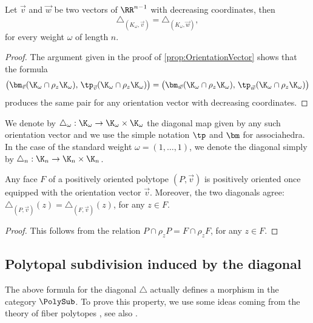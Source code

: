 \begin{proposition}\label{prop:IndepVect}
Let $\vec v$ and $\vec w$ be two vectors of $\RR^{n-1}$ with decreasing coordinates, then \[\triangle_{(K_\omega, \vec v)}=\triangle_{(K_\omega, \vec w)},\]
for every weight $\omega$ of length $n$.
\end{proposition}

\begin{proof}
The argument given in the proof of \cref{prop:OrientationVector} shows that the formula
\[\bigl(\bm_{\vec v}(\K_\omega\cap \rho_z \K_\omega),\, \tp_{\vec v}(\K_\omega\cap \rho_z \K_\omega)\bigr)=
\bigl(\bm_{\vec w}(\K_\omega\cap \rho_z \K_\omega),\, \tp_{\vec w}(\K_\omega\cap \rho_z \K_\omega)\bigr)
\]
produces the same pair for any orientation vector with decreasing coordinates.
\end{proof}

We denote by $\triangle_\omega : \K_\omega\to \K_\omega \times \K_\omega$ the diagonal map given by any such orientation vector and we use the simple notation $\tp$ and $\bm$ for associahedra.
In the case of the standard weight $\omega=(1, \ldots, 1)$, we denote the diagonal simply by $\triangle_n : \K_n \to \K_n\times \K_n$.

\begin{lemma}\label{Lemma:DiagOnFace}
Any face $F$ of a positively oriented polytope $(P,\vec v)$ is positively oriented once equipped with the orientation vector $\vec v$. Moreover, the two diagonals agree: $\triangle_{(P, \vec v)}(z)=\triangle_{(F, \vec v)}(z)$, for any $z\in F$.
\end{lemma}

\begin{proof}
This follows from the relation
$P\cap \rho_z P= F\cap \rho_z F$, for any $z\in F$.
\end{proof}

\subsection{Polytopal subdivision induced by the diagonal}\label{subsec:PolySubDiv}
The above formula for the diagonal $\triangle$ actually defines a morphism in the category $\PolySub$.
To prove this property, we use some ideas coming from the theory of fiber polytopes \cite{BilleraSturmfels92}, see also \cite[Chap.\,9]{Ziegler95}.

